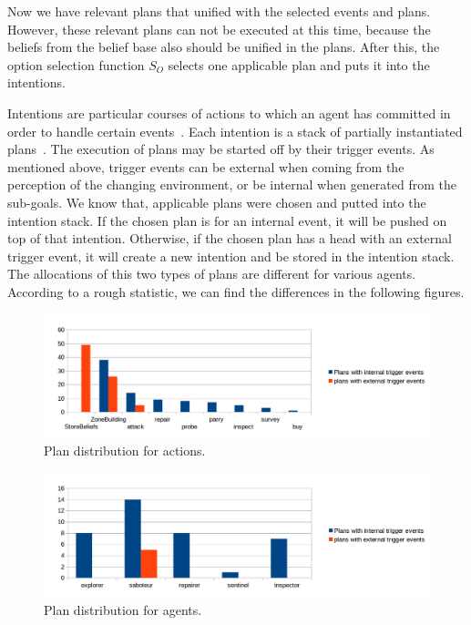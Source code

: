 Now we have relevant plans that unified with the selected events and plans.
However, these relevant plans can not be executed at this time, because the beliefs from the belief base also should be unified in the plans.
After this, the option selection function $S_O$ selects one applicable plan and puts it into the intentions.

Intentions are particular courses of actions to which an agent has committed in order to handle certain events~\cite{rafael_BDIAgent_2005}.
Each intention is a stack of partially instantiated plans~\cite{rafael_Javabased_2007}.
The execution of plans may be started off by their trigger events.
As mentioned above, trigger events can be external when coming from the perception of the changing environment, or be internal when generated from the sub-goals.
We know that, applicable plans were chosen and putted into the intention stack.
If the chosen plan is for an internal event, it will be pushed on top of that intention.
Otherwise, if the chosen plan has a head with an external trigger event, it will create a new intention and be stored in the intention stack.
The allocations of this two types of plans are different for various agents.
According to a rough statistic, we can find the differences in the following figures.
\begin{figure}
  \centering
  \includegraphics[width=\textwidth]{images/BDI_plan_distribution_action}
  \caption{Plan distribution for actions.}
  \label{fig:plan_allocation}
\end{figure}
\begin{figure}
  \centering
  \includegraphics[width=\textwidth]{images/BDI_plan_distribution_role}
  \caption{Plan distribution for agents.}
  \label{fig:baselinex}
\end{figure}

